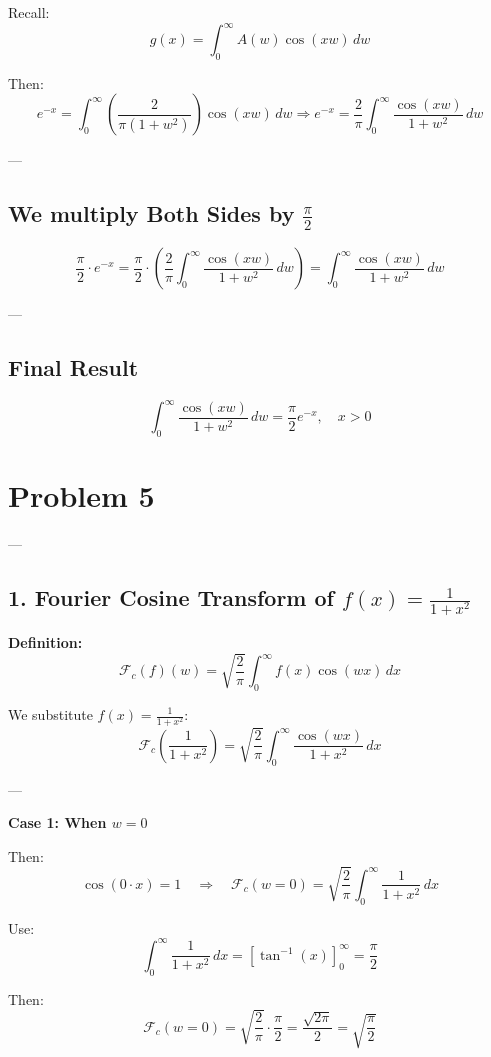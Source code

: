 \documentclass{article}
\begin{document}
Recall:
\[
g(x) = \int_0^\infty A(w) \cos(xw) \, dw
\]

Then:
\[
e^{-x} = \int_0^\infty \left( \frac{2}{\pi(1 + w^2)} \right) \cos(xw) \, dw
\Rightarrow
e^{-x} = \frac{2}{\pi} \int_0^\infty \frac{\cos(xw)}{1 + w^2} \, dw
\]

---

\subsection*{We multiply Both Sides by \( \frac{\pi}{2} \)}

\[
\frac{\pi}{2} \cdot e^{-x}
= \frac{\pi}{2} \cdot \left( \frac{2}{\pi} \int_0^\infty \frac{\cos(xw)}{1 + w^2} \, dw \right)
= \int_0^\infty \frac{\cos(xw)}{1 + w^2} \, dw
\]

---

\subsection*{Final Result}

\[
\boxed{
\int_0^\infty \frac{\cos(xw)}{1 + w^2} \, dw = \frac{\pi}{2} e^{-x}, \quad x > 0
}
\]

\newpage
\section*{Problem 5}

---

\subsection*{1. Fourier Cosine Transform of \( f(x) = \frac{1}{1 + x^2} \)}

\textbf{Definition:}
\[
\mathcal{F}_c(f)(w) = \sqrt{\frac{2}{\pi}} \int_0^\infty f(x) \cos(wx) \, dx
\]

We substitute \( f(x) = \frac{1}{1 + x^2} \):
\[
\mathcal{F}_c\left( \frac{1}{1 + x^2} \right) = \sqrt{\frac{2}{\pi}} \int_0^\infty \frac{\cos(wx)}{1 + x^2} \, dx
\]

---

\textbf{Case 1: When \( w = 0 \)}

Then:
\[
\cos(0 \cdot x) = 1 \quad \Rightarrow \quad \mathcal{F}_c(w = 0) = \sqrt{\frac{2}{\pi}} \int_0^\infty \frac{1}{1 + x^2} \, dx
\]

Use:
\[
\int_0^\infty \frac{1}{1 + x^2} \, dx = \left[ \tan^{-1}(x) \right]_0^\infty = \frac{\pi}{2}
\]

Then:
\[
\mathcal{F}_c(w = 0) = \sqrt{\frac{2}{\pi}} \cdot \frac{\pi}{2}
= \frac{\sqrt{2\pi}}{2}
= \boxed{ \sqrt{ \frac{\pi}{2} } }
\]
\end{document}
